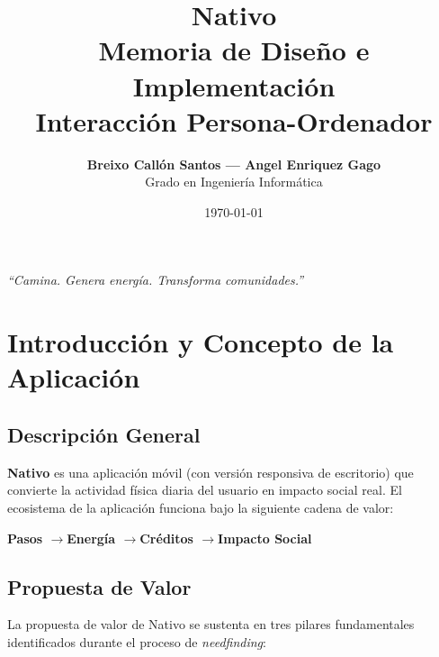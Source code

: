 \documentclass[12pt, a4paper]{article}
\title{%
  \vspace{-1cm}
  {\Huge\textbf{\textcolor{nativoPrimary}{Nativo}}}\\[0.4cm]
  {\Large\textcolor{nativoGray}{Memoria de Diseño e Implementación}}\\[0.2cm]
  {\large\textcolor{nativoText}{Interacción Persona-Ordenador}}
}
\author{
  \textbf{Breixo Callón Santos --- Angel Enriquez Gago}\\[0.2cm]
  \textcolor{nativoGray}{Grado en Ingeniería Informática}
}
\date{\textcolor{nativoGray}{\today}}
\begin{document}
\maketitle
\thispagestyle{empty}

\vspace{0.5cm}
\begin{center}
  \large\textit{\textcolor{nativoGray}{``Camina. Genera energía. Transforma comunidades.''}}
\end{center}


\newpage
\tableofcontents
\newpage

\section{Introducción y Concepto de la Aplicación}

\subsection{Descripción General}

\textbf{Nativo} es una aplicación móvil (con versión responsiva de escritorio) que convierte la actividad física diaria del usuario en impacto social real. El ecosistema de la aplicación funciona bajo la siguiente cadena de valor:

\begin{center}
\begin{mdframed}[backgroundcolor=nativoPale, linecolor=nativoPrimary, linewidth=1.5pt, roundcorner=8pt]
\begin{center}
\vspace{6pt}
{\Large\textbf{\textcolor{nativoDark}{Pasos \quad$\rightarrow$\quad Energía \quad$\rightarrow$\quad Créditos \quad$\rightarrow$\quad Impacto Social}}}
\vspace{6pt}
\end{center}
\end{mdframed}
\end{center}

\subsection{Propuesta de Valor}

La propuesta de valor de Nativo se sustenta en tres pilares fundamentales identificados durante el proceso de \textit{needfinding}:
\end{document}

